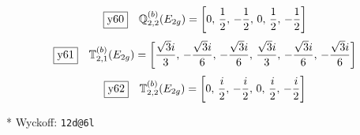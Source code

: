 \documentclass[fleqn,10pt,landscape]{jsarticle}
\begin{document}
\begin{dmath*}
\fbox{y60}\quad \mathbb{Q}_{2,2}^{(b)}(E_{2g})=\left[ 0,\, \frac{1}{2},\, - \frac{1}{2},\, 0,\, \frac{1}{2},\, - \frac{1}{2} \right]
\end{dmath*}
\begin{dmath*}
\fbox{y61}\quad \mathbb{T}_{2,1}^{(b)}(E_{2g})=\left[ \frac{\sqrt{3} i}{3},\, - \frac{\sqrt{3} i}{6},\, - \frac{\sqrt{3} i}{6},\, \frac{\sqrt{3} i}{3},\, - \frac{\sqrt{3} i}{6},\, - \frac{\sqrt{3} i}{6} \right]
\end{dmath*}
\begin{dmath*}
\fbox{y62}\quad \mathbb{T}_{2,2}^{(b)}(E_{2g})=\left[ 0,\, \frac{i}{2},\, - \frac{i}{2},\, 0,\, \frac{i}{2},\, - \frac{i}{2} \right]
\end{dmath*}
\vspace{5mm}

\noindent ** Wyckoff: \texttt{12d@6l}
\end{document}
